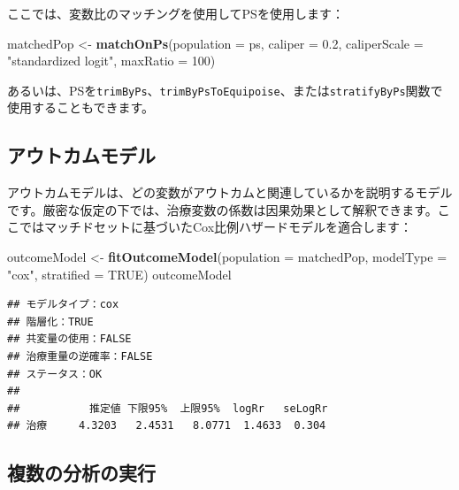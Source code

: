 \documentclass[
  11pt]{book}
\newenvironment{Shaded}{\begin{snugshade}}{\end{snugshade}}
\newcommand{\AttributeTok}[1]{\textcolor[rgb]{0.13,0.29,0.53}{#1}}
\newcommand{\ConstantTok}[1]{\textcolor[rgb]{0.56,0.35,0.01}{#1}}
\newcommand{\DecValTok}[1]{\textcolor[rgb]{0.00,0.00,0.81}{#1}}
\newcommand{\FloatTok}[1]{\textcolor[rgb]{0.00,0.00,0.81}{#1}}
\newcommand{\FunctionTok}[1]{\textcolor[rgb]{0.13,0.29,0.53}{\textbf{#1}}}
\newcommand{\NormalTok}[1]{#1}
\newcommand{\OtherTok}[1]{\textcolor[rgb]{0.56,0.35,0.01}{#1}}
\newcommand{\StringTok}[1]{\textcolor[rgb]{0.31,0.60,0.02}{#1}}
\theoremstyle{definition}
\theoremstyle{definition}
\theoremstyle{definition}
\theoremstyle{definition}
\theoremstyle{remark}
\begin{document}
ここでは、変数比のマッチングを使用してPSを使用します：

\begin{Shaded}
\begin{Highlighting}[]
\NormalTok{matchedPop }\OtherTok{\textless{}{-}} \FunctionTok{matchOnPs}\NormalTok{(}\AttributeTok{population =}\NormalTok{ ps, }\AttributeTok{caliper =} \FloatTok{0.2}\NormalTok{,}
                        \AttributeTok{caliperScale =} \StringTok{"standardized logit"}\NormalTok{, }\AttributeTok{maxRatio =} \DecValTok{100}\NormalTok{)}
\end{Highlighting}
\end{Shaded}

あるいは、PSを\texttt{trimByPs}、\texttt{trimByPsToEquipoise}、または\texttt{stratifyByPs}関数で使用することもできます。

\subsection{アウトカムモデル}\label{ux30a2ux30a6ux30c8ux30abux30e0ux30e2ux30c7ux30eb}

アウトカムモデルは、どの変数がアウトカムと関連しているかを説明するモデルです。厳密な仮定の下では、治療変数の係数は因果効果として解釈できます。ここではマッチドセットに基づいたCox比例ハザードモデルを適合します：

\begin{Shaded}
\begin{Highlighting}[]
\NormalTok{outcomeModel }\OtherTok{\textless{}{-}} \FunctionTok{fitOutcomeModel}\NormalTok{(}\AttributeTok{population =}\NormalTok{ matchedPop,}
                                \AttributeTok{modelType =} \StringTok{"cox"}\NormalTok{,}
                                \AttributeTok{stratified =} \ConstantTok{TRUE}\NormalTok{)}
\NormalTok{outcomeModel}
\end{Highlighting}
\end{Shaded}

\begin{verbatim}
## モデルタイプ：cox
## 階層化：TRUE
## 共変量の使用：FALSE
## 治療重量の逆確率：FALSE
## ステータス：OK
## 
##           推定値 下限95%  上限95%  logRr   seLogRr
## 治療     4.3203   2.4531   8.0771  1.4633  0.304
\end{verbatim}

\subsection{複数の分析の実行}\label{MultipleAnalyses}
\end{document}
